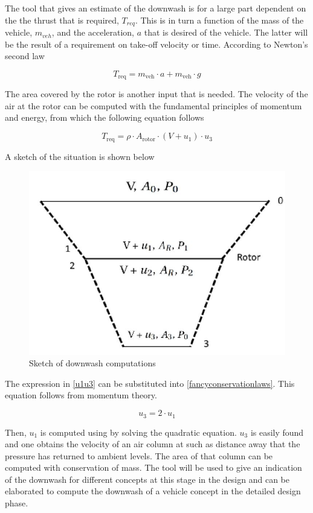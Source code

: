 The tool that gives an estimate of the downwash is for a large part dependent on the the thrust that is required, $T_{req}$. This is in turn a function of the mass of the vehicle, $m_{veh}$, and the acceleration, $a$ that is desired of the vehicle. The latter will be the result of a requirement on take-off velocity or time. According to Newton's second law 

\begin{equation}
\label{downwasheq}
    T_\text{req} = m_\text{veh} \cdot a + m_\text{veh} \cdot g 
\end{equation}

The area covered by the rotor is another input that is needed. The velocity of the air at the rotor can be computed with the fundamental principles of momentum and energy, from which the following equation follows 

\begin{equation}
\label{fancyconservationlaws}
    T_\text{req} = \rho\cdot A_\text{rotor}\cdot(V + u_1)\cdot u_3 
\end{equation}

A sketch of the situation is shown below

\begin{figure}[H]
    \centering
    \includegraphics[width=0.5\linewidth]{Figures/downwashsketch.JPG}
    \captionsetup{justification=centering}
    \caption{Sketch of downwash computations}
    \label{downwashsketch}
\end{figure}

The expression in \autoref{u1u3} can be substituted into \autoref{fancyconservationlaws}. This equation follows from momentum theory. 

\begin{equation}
\label{u1u3}
    u_3 = 2\cdot u_1
\end{equation}

Then, $u_1$ is computed using by solving the quadratic equation. $u_3$ is easily found and one obtains the velocity of an air column at such as distance away that the pressure has returned to ambient levels. The area of that column can be computed with conservation of mass. The tool will be used to give an indication of the downwash for different concepts at this stage in the design and can be elaborated to compute the downwash of a vehicle concept in the detailed design phase. 

